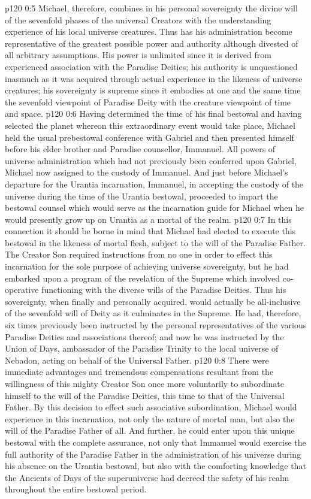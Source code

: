 \vs p120 0:5 Michael, therefore, combines in his personal sovereignty the divine will of the sevenfold phases of the universal Creators with the understanding experience of his local universe creatures. Thus has his administration become representative of the greatest possible power and authority although divested of all arbitrary assumptions. His power is unlimited since it is derived from experienced association with the Paradise Deities; his authority is unquestioned inasmuch as it was acquired through actual experience in the likeness of universe creatures; his sovereignty is supreme since it embodies at one and the same time the sevenfold viewpoint of Paradise Deity with the creature viewpoint of time and space.
\vs p120 0:6 \pc Having determined the time of his final bestowal and having selected the planet whereon this extraordinary event would take place, Michael held the usual prebestowal conference with Gabriel and then presented himself before his elder brother and Paradise counsellor, Immanuel. All powers of universe administration which had not previously been conferred upon Gabriel, Michael now assigned to the custody of Immanuel. And just before Michael’s departure for the Urantia incarnation, Immanuel, in accepting the custody of the universe during the time of the Urantia bestowal, proceeded to impart the bestowal counsel which would serve as the incarnation guide for Michael when he would presently grow up on Urantia as a mortal of the realm.
\vs p120 0:7 \pc In this connection it should be borne in mind that Michael had elected to execute this bestowal in the likeness of mortal flesh, subject to the will of the Paradise Father. The Creator Son required instructions from no one in order to effect this incarnation for the sole purpose of achieving universe sovereignty, but he had embarked upon a program of the revelation of the Supreme which involved co\hyp{}operative functioning with the diverse wills of the Paradise Deities. Thus his sovereignty, when finally and personally acquired, would actually be all\hyp{}inclusive of the sevenfold will of Deity as it culminates in the Supreme. He had, therefore, six times previously been instructed by the personal representatives of the various Paradise Deities and associations thereof; and now he was instructed by the Union of Days, ambassador of the Paradise Trinity to the local universe of Nebadon, acting on behalf of the Universal Father.
\vs p120 0:8 \pc There were immediate advantages and tremendous compensations resultant from the willingness of this mighty Creator Son once more voluntarily to subordinate himself to the will of the Paradise Deities, this time to that of the Universal Father. By this decision to effect such associative subordination, Michael would experience in this incarnation, not only the nature of mortal man, but also the will of the Paradise Father of all. And further, he could enter upon this unique bestowal with the complete assurance, not only that Immanuel would exercise the full authority of the Paradise Father in the administration of his universe during his absence on the Urantia bestowal, but also with the comforting knowledge that the Ancients of Days of the superuniverse had decreed the safety of his realm throughout the entire bestowal period.
